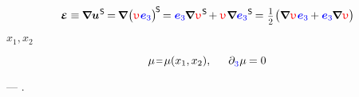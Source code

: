 \nopagebreak\vspace{-0.25em}
\begin{equation}
\infinitesimaldeformation
\equiv \hspace{-0.1ex}
\boldnabla {\bm{u}}^{\hspace{.1ex}\mathsf{S}} \hspace{-0.2ex}
= \hspace{-0.2ex}
\boldnabla \hspace{.1ex} \bigl(
   \antiplanedisplacement
   \hspace{.1ex}
   \mathcolor{blue}{\bm{e}_3}
\bigr)^{\hspace{-0.2ex} \mathsf{S} } \hspace{-0.25ex}
   = \mathcolor{blue}{\bm{e}_3}
   \hspace{-0.15ex} \boldnabla \hspace{.1ex}
   \antiplanedisplacement^{\hspace{.1ex}\mathsf{S}}
   \hspace{-0.25ex} +
   \antiplanedisplacement \hspace{.1ex}
   \tikzmark{beginZero2}
      \boldnabla
      \mathcolor{blue}{\bm{e}_3}
   \tikzmark{endZero2}^{\mathsf{S}} \hspace{-0.2ex}
   = \hspace{.1ex}
   \smalldisplaystyleonehalf \hspace{.1ex}
   \bigl(
      \boldnabla \hspace{.1ex} \antiplanedisplacement \hspace{.12ex}
      \mathcolor{blue}{\bm{e}_3} \hspace{-0.1ex}
      + \mathcolor{blue}{\bm{e}_3} \hspace{-0.15ex}
      \boldnabla \hspace{.1ex} \antiplanedisplacement
   \bigr)
\end{equation}%
%

${x_1, x_2}$

\begin{equation*}
\mu \narroweq \mu(x_1, x_2) ,
\hspace{1.5em}
\partial_{
   \raisemath{-0.15ex}{ \mathcolor{blue}{3} }
} \hspace{.08ex} \mu \hspace{-0.1ex} = 0
\end{equation*}

\noindent
---
.

